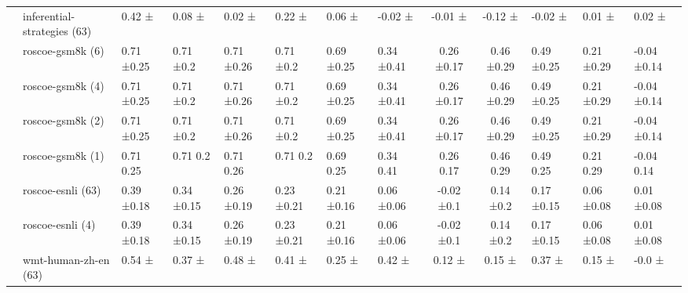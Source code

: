 \begin{tabular}{llllllll|cc}
 & inferential-strategies (63) & 0.42 ± & 0.08 ± & 0.02 ± & 0.22 ± & 0.06 ± & -0.02 ± & -0.01 ± & -0.12 ± & -0.02 ± & 0.01 ± & 0.02 ± \\
 & roscoe-gsm8k (6) & 0.71 ±0.25 & 0.71 ±0.2 & 0.71 ±0.26 & 0.71 ±0.2 & 0.69 ±0.25 & 0.34 ±0.41 & 0.26 ±0.17 & 0.46 ±0.29 & 0.49 ±0.25 & 0.21 ±0.29 & -0.04 ±0.14 \\
 & roscoe-gsm8k (4) & 0.71 ±0.25 & 0.71 ±0.2 & 0.71 ±0.26 & 0.71 ±0.2 & 0.69 ±0.25 & 0.34 ±0.41 & 0.26 ±0.17 & 0.46 ±0.29 & 0.49 ±0.25 & 0.21 ±0.29 & -0.04 ±0.14 \\
 & roscoe-gsm8k (2) & 0.71 ±0.25 & 0.71 ±0.2 & 0.71 ±0.26 & 0.71 ±0.2 & 0.69 ±0.25 & 0.34 ±0.41 & 0.26 ±0.17 & 0.46 ±0.29 & 0.49 ±0.25 & 0.21 ±0.29 & -0.04 ±0.14 \\
 & roscoe-gsm8k (1) & 0.71 0.25 & 0.71 0.2 & 0.71 0.26 & 0.71 0.2 & 0.69 0.25 & 0.34 0.41 & 0.26 0.17 & 0.46 0.29 & 0.49 0.25 & 0.21 0.29 & -0.04 0.14 \\
 & roscoe-esnli (63) & 0.39 ±0.18 & 0.34 ±0.15 & 0.26 ±0.19 & 0.23 ±0.21 & 0.21 ±0.16 & 0.06 ±0.06 & -0.02 ±0.1 & 0.14 ±0.2 & 0.17 ±0.15 & 0.06 ±0.08 & 0.01 ±0.08 \\
 & roscoe-esnli (4) & 0.39 ±0.18 & 0.34 ±0.15 & 0.26 ±0.19 & 0.23 ±0.21 & 0.21 ±0.16 & 0.06 ±0.06 & -0.02 ±0.1 & 0.14 ±0.2 & 0.17 ±0.15 & 0.06 ±0.08 & 0.01 ±0.08 \\
 & wmt-human-zh-en (63) & 0.54 ± & 0.37 ± & 0.48 ± & 0.41 ± & 0.25 ± & 0.42 ± & 0.12 ± & 0.15 ± & 0.37 ± & 0.15 ± & -0.0 ± \\
\bottomrule
\end{tabular}
